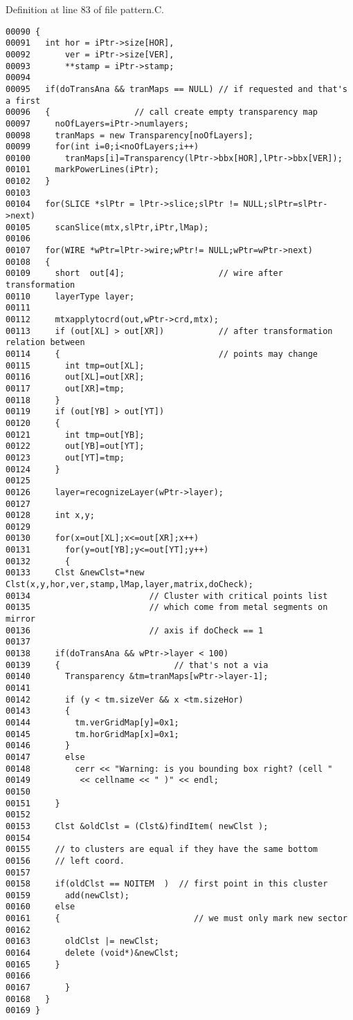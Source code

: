 Definition at line 83 of file pattern.C.\small\begin{verbatim}00090 {
00091   int hor = iPtr->size[HOR],
00092       ver = iPtr->size[VER],
00093       **stamp = iPtr->stamp;
00094 
00095   if(doTransAna && tranMaps == NULL) // if requested and that's a first
00096   {                 // call create empty transparency map
00097     noOfLayers=iPtr->numlayers;
00098     tranMaps = new Transparency[noOfLayers];
00099     for(int i=0;i<noOfLayers;i++)
00100       tranMaps[i]=Transparency(lPtr->bbx[HOR],lPtr->bbx[VER]);
00101     markPowerLines(iPtr);
00102   }
00103 
00104   for(SLICE *slPtr = lPtr->slice;slPtr != NULL;slPtr=slPtr->next)
00105     scanSlice(mtx,slPtr,iPtr,lMap);
00106 
00107   for(WIRE *wPtr=lPtr->wire;wPtr!= NULL;wPtr=wPtr->next)
00108   {
00109     short  out[4];                   // wire after transformation
00110     layerType layer;
00111 
00112     mtxapplytocrd(out,wPtr->crd,mtx);
00113     if (out[XL] > out[XR])           // after transformation relation between
00114     {                                // points may change
00115       int tmp=out[XL];
00116       out[XL]=out[XR];
00117       out[XR]=tmp;
00118     }  
00119     if (out[YB] > out[YT])
00120     {
00121       int tmp=out[YB];
00122       out[YB]=out[YT];
00123       out[YT]=tmp;
00124     }  
00125 
00126     layer=recognizeLayer(wPtr->layer);
00127     
00128     int x,y;
00129 
00130     for(x=out[XL];x<=out[XR];x++)
00131       for(y=out[YB];y<=out[YT];y++)
00132       {
00133     Clst &newClst=*new Clst(x,y,hor,ver,stamp,lMap,layer,matrix,doCheck);
00134                        // Cluster with critical points list
00135                        // which come from metal segments on mirror
00136                        // axis if doCheck == 1
00137 
00138     if(doTransAna && wPtr->layer < 100)
00139     {                       // that's not a via
00140       Transparency &tm=tranMaps[wPtr->layer-1];
00141       
00142       if (y < tm.sizeVer && x <tm.sizeHor)
00143       {
00144         tm.verGridMap[y]=0x1;
00145         tm.horGridMap[x]=0x1;
00146       }
00147       else
00148         cerr << "Warning: is you bounding box right? (cell " 
00149          << cellname << " )" << endl;
00150         
00151     }
00152 
00153     Clst &oldClst = (Clst&)findItem( newClst );
00154     
00155     // to clusters are equal if they have the same bottom
00156     // left coord.
00157     
00158     if(oldClst == NOITEM  )  // first point in this cluster
00159       add(newClst);
00160     else
00161     {                           // we must only mark new sector
00162 
00163       oldClst |= newClst;
00164       delete (void*)&newClst;
00165     }  
00166 
00167       }
00168   }
00169 }
\end{verbatim}\normalsize 
\label{Pattern_c1}

